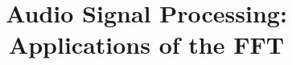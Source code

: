 \documentclass[11pt]{article}
\title{Audio Signal Processing: Applications of the FFT}
\begin{document}
\maketitle
    
    \pagebreak
    
    \pagebreak
\end{document}
